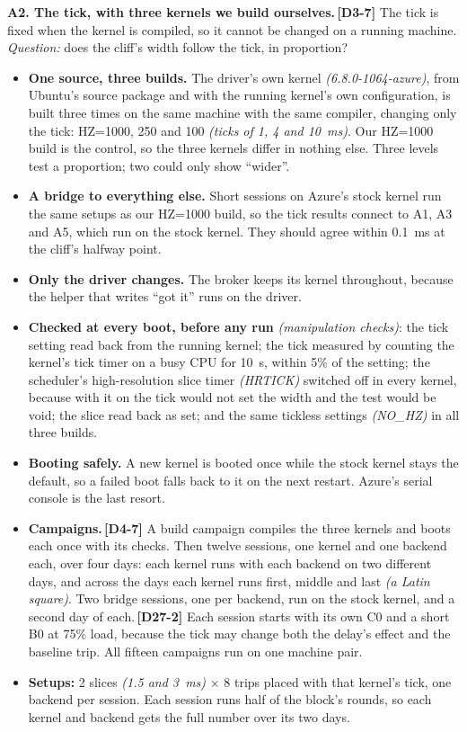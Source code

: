 \documentclass[11pt]{article}
\newcommand{\gl}[1]{{\color{soft}\itshape\small (#1)}}
\newcommand{\chgold}[1]{\,{\color{oldcol}\bfseries\footnotesize[#1]}}
\begin{document}
\textbf{A2. The tick, with three kernels we build ourselves.}\chgold{D3-7} The tick is fixed when the kernel is compiled, so it cannot be changed on a running machine. \emph{Question:} does the cliff's width follow the tick, in proportion?
\begin{itemize}
  \item \textbf{One source, three builds.} The driver's own kernel \gl{6.8.0-1064-azure}, from Ubuntu's source package and with the running kernel's own configuration, is built three times on the same machine with the same compiler, changing only the tick: HZ=1000, 250 and 100 \gl{ticks of 1, 4 and 10~ms}. Our HZ=1000 build is the control, so the three kernels differ in nothing else. Three levels test a proportion; two could only show ``wider''.
  \item \textbf{A bridge to everything else.} Short sessions on Azure's stock kernel run the same setups as our HZ=1000 build, so the tick results connect to A1, A3 and A5, which run on the stock kernel. They should agree within 0.1~ms at the cliff's halfway point.
  \item \textbf{Only the driver changes.} The broker keeps its kernel throughout, because the helper that writes ``got it'' runs on the driver.
  \item \textbf{Checked at every boot, before any run} \gl{manipulation checks}: the tick setting read back from the running kernel; the tick measured by counting the kernel's tick timer on a busy CPU for 10~s, within 5\% of the setting; the scheduler's high-resolution slice timer \gl{HRTICK} switched off in every kernel, because with it on the tick would not set the width and the test would be void; the slice read back as set; and the same tickless settings \gl{NO\_HZ} in all three builds.
  \item \textbf{Booting safely.} A new kernel is booted once while the stock kernel stays the default, so a failed boot falls back to it on the next restart. Azure's serial console is the last resort.
  \item \textbf{Campaigns.}\chgold{D4-7} A build campaign compiles the three kernels and boots each once with its checks. Then twelve sessions, one kernel and one backend each, over four days: each kernel runs with each backend on two different days, and across the days each kernel runs first, middle and last \gl{a Latin square}. Two bridge sessions, one per backend, run on the stock kernel, and a second day of each.\chgold{D27-2} Each session starts with its own C0 and a short B0 at 75\% load, because the tick may change both the delay's effect and the baseline trip. All fifteen campaigns run on one machine pair.
  \item \textbf{Setups:} 2 slices \gl{1.5 and 3~ms} $\times$ 8 trips placed with that kernel's tick, one backend per session. Each session runs half of the block's rounds, so each kernel and backend gets the full number over its two days.
\end{itemize}
\end{document}
